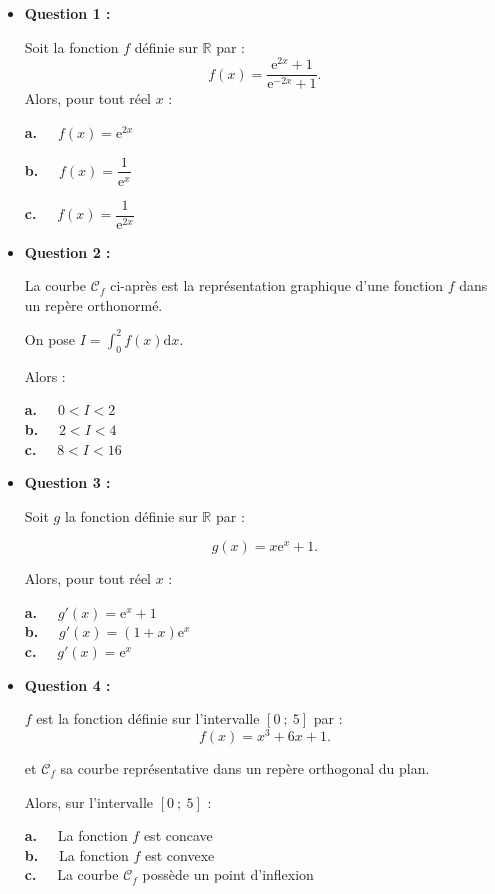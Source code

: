 \begin{itemize}
     \item \textbf{Question 1 :}
     \par
     Soit la fonction $f$ définie sur $\mathbb{R}$ par :
     \[ f(x)=\dfrac{\text{e}^{2x}+1}{\text{e}^{-2x}+1}. \]
     Alors, pour tout réel $x$ :
     \par
     \textbf{a.~~} $f(x)=\text{e}^{2x}$
     \par
     \textbf{b.~~}  $f(x)=\dfrac{1}{\text{e}^{x}}$
     \par
     \textbf{c.~~}  $f(x)=\dfrac{1}{\text{e}^{2x}}$
     \par
     \vspace{5mm}
     \item \textbf{Question 2 :}
     \par
     La courbe $\mathscr{C}_f$ ci-après est la représentation graphique d'une fonction $f$ dans un repère orthonormé.

\begin{center}
\end{center} 
     On pose $I= \displaystyle\int_{0}^{2}f(x)\text{d}x$.
     \par
     Alors :
     \par
     \textbf{a.~~} $0 < I < 2$ \\
     \textbf{b.~~} $2 < I < 4$ \\
     \textbf{c.~~} $8 < I < 16$ \\
     \item \textbf{Question 3 :}
     \par
     Soit $g$ la fonction définie sur $\mathbb{R}$ par :
     \par
     \[ g(x)=x \text{e}^{x}+1. \]
     \par
     Alors, pour tout réel $x$ :
     \par
     \textbf{a.~~} $g'(x)=\text{e}^{x}+1$ \\
     \textbf{b.~~} $g'(x)=(1+x)\text{e}^{x}$  \\
     \textbf{c.~~} $g'(x)=\text{e}^{x}$ \\
     \item \textbf{Question 4 :}
     \par
     $f$ est la fonction définie sur l'intervalle $[0~;~5]$ par :
     \[ f(x)=x^3+6x+1. \]
     \par
     et $\mathscr{C}_f$ sa courbe représentative dans un repère orthogonal du plan.
     \par
     Alors, sur l'intervalle $[0~;~5]$  :
     \par
     \textbf{a.~~} La fonction $f$ est concave \\
     \textbf{b.~~} La fonction $f$ est convexe \\
     \textbf{c.~~} La courbe $\mathscr{C}_f$ possède un point d'inflexion \\
     \par
\end{itemize}
